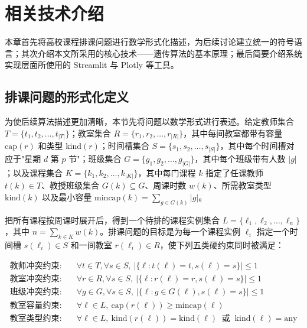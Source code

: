 \hspace*{\fill}
\section{相关技术介绍}

本章首先将高校课程排课问题进行数学形式化描述，为后续讨论建立统一的符号语言；其次介绍本文所采用的核心技术——遗传算法的基本原理；最后简要介绍系统实现层面所使用的 Streamlit 与 Plotly 等工具。

\subsection{排课问题的形式化定义}

为使后续算法描述更加清晰，本节先将问题以数学形式进行表述。给定教师集合 $T = \{t_1, t_2, \ldots, t_{|T|}\}$；教室集合 $R = \{r_1, r_2, \ldots, r_{|R|}\}$，其中每间教室都带有容量 $\mathrm{cap}(r)$ 和类型 $\mathrm{kind}(r)$；时间槽集合 $S = \{s_1, s_2, \ldots, s_{|S|}\}$，其中每个时间槽对应于"星期 $d$ 第 $p$ 节"；班级集合 $G = \{g_1, g_2, \ldots, g_{|G|}\}$，其中每个班级带有人数 $|g|$；以及课程集合 $K = \{k_1, k_2, \ldots, k_{|K|}\}$，其中每门课程 $k$ 指定了任课教师 $t(k) \in T$、教授班级集合 $G(k) \subseteq G$、周课时数 $w(k)$、所需教室类型 $\mathrm{kind}(k)$ 以及最小容量 $\mathrm{mincap}(k) = \sum_{g \in G(k)} |g|$。

把所有课程按周课时展开后，得到一个待排的课程实例集合 $L = \{\ell_1, \ell_2, \ldots, \ell_n\}$，其中 $n = \sum_{k \in K} w(k)$。排课问题的目标是为每一个课程实例 $\ell_i$ 指定一个时间槽 $s(\ell_i) \in S$ 和一间教室 $r(\ell_i) \in R$，使下列五类硬约束同时被满足：

\begin{align}
\text{教师冲突约束}: \quad & \forall t \in T, \forall s \in S, \ |\{\ell : t(\ell) = t, s(\ell) = s\}| \leq 1 \\
\text{教室冲突约束}: \quad & \forall r \in R, \forall s \in S, \ |\{\ell : r(\ell) = r, s(\ell) = s\}| \leq 1 \\
\text{班级冲突约束}: \quad & \forall g \in G, \forall s \in S, \ |\{\ell : g \in G(\ell), s(\ell) = s\}| \leq 1 \\
\text{教室容量约束}: \quad & \forall \ell \in L, \ \mathrm{cap}(r(\ell)) \geq \mathrm{mincap}(\ell) \\
\text{教室类型约束}: \quad & \forall \ell \in L, \ \mathrm{kind}(r(\ell)) = \mathrm{kind}(\ell) \;\;\text{或}\;\; \mathrm{kind}(\ell) = \text{any}
\end{align}

